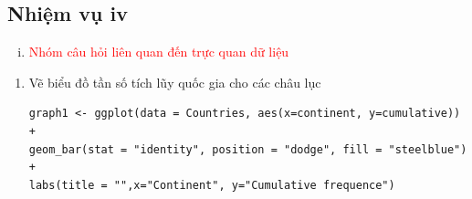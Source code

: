 \documentclass[a4paper]{article}
\theoremstyle{definition}
\begin{document}
\subsection{Nhiệm vụ iv}
\begin{enumerate}[iv)]
\item \textcolor{red}{Nhóm câu hỏi liên quan đến trực quan dữ liệu}
\end{enumerate}
\begin{enumerate}[1)]
{\bf Xử lý chung cho câu 1 và 2} \\
Chúng ta tính tổng số quốc gia dựa trên châu lục, tính tỉ lệ số đất nước từng châu lục so với số đất nước toàn thế giới rồi đưa chúng vào bảng.
\begin{lstlisting}
Countries <- dataFile %>% select(location)
Con <- dataFile %>% select(continent)
temp<- cbind(Countries,Con)
temp <- distinct(temp)
Countries <- count(temp, 'continent')
probability <- prop.table(Countries[,2])
cumulative <- cumsum(Countries[,2])
Countries <- cbind(Countries, probability,cumulative)
\end{lstlisting}
\item Vẽ biểu đồ tần số tích lũy quốc gia cho các châu lục
\begin{lstlisting}
graph1 <- ggplot(data = Countries, aes(x=continent, y=cumulative)) +
geom_bar(stat = "identity", position = "dodge", fill = "steelblue") +
labs(title = "",x="Continent", y="Cumulative frequence") 


\end{lstlisting}
\end{enumerate}
\end{document}
